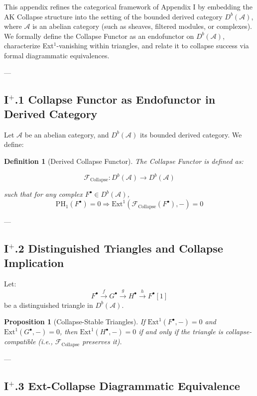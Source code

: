 \documentclass[11pt]{article}
\newtheorem{definition}[theorem]{Definition}
\newtheorem{proposition}[theorem]{Proposition}
\begin{document}
This appendix refines the categorical framework of Appendix I by embedding the AK Collapse structure  
into the setting of the bounded derived category \( D^b(\mathcal{A}) \), where \(\mathcal{A}\) is an abelian category  
(such as sheaves, filtered modules, or complexes). We formally define the Collapse Functor  
as an endofunctor on \( D^b(\mathcal{A}) \), characterize Ext$^1$-vanishing within triangles,  
and relate it to collapse success via formal diagrammatic equivalences.

---

\subsection*{I$^{+}$.1 Collapse Functor as Endofunctor in Derived Category}

Let \( \mathcal{A} \) be an abelian category, and \( D^b(\mathcal{A}) \) its bounded derived category.  
We define:

\begin{definition}[Derived Collapse Functor]
The Collapse Functor is defined as:

\[
\mathcal{F}_{\mathrm{Collapse}} : D^b(\mathcal{A}) \to D^b(\mathcal{A})
\]

such that for any complex \( F^\bullet \in D^b(\mathcal{A}) \),  
\[
\mathrm{PH}_1(F^\bullet) = 0 \Rightarrow \mathrm{Ext}^1(\mathcal{F}_{\mathrm{Collapse}}(F^\bullet), -) = 0
\]
\end{definition}

---

\subsection*{I$^{+}$.2 Distinguished Triangles and Collapse Implication}

Let:
\[
F^\bullet \xrightarrow{f} G^\bullet \xrightarrow{g} H^\bullet \xrightarrow{h} F^\bullet[1]
\]
be a distinguished triangle in \( D^b(\mathcal{A}) \).

\begin{proposition}[Collapse-Stable Triangles]
If \( \mathrm{Ext}^1(F^\bullet, -) = 0 \) and \( \mathrm{Ext}^1(G^\bullet, -) = 0 \),  
then \( \mathrm{Ext}^1(H^\bullet, -) = 0 \) if and only if  
the triangle is collapse-compatible (i.e., \(\mathcal{F}_{\mathrm{Collapse}}\) preserves it).
\end{proposition}

---

\subsection*{I$^{+}$.3 Ext-Collapse Diagrammatic Equivalence}
\end{document}
